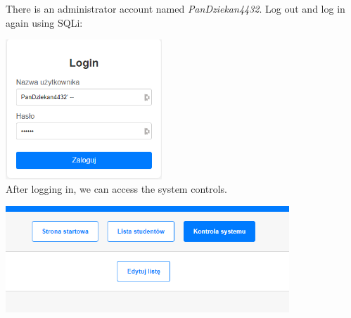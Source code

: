 \documentclass{article}
\begin{document}
\newpage
There is an administrator account named \textit{PanDziekan4432}. Log out and log in again using SQLi:
\vspace{3mm}
\begin{multicols}{2}
    \includegraphics[width=0.44\textwidth]{"image33.png"}
    \columnbreak \\
    After logging in, we can access the system controls.
\end{multicols}
\begin{center}
    \includegraphics[width=0.8\textwidth]{"image34.png"}
\end{center}
\vspace{3mm}
\end{document}

